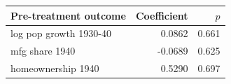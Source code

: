 \begin{tabular}{lrr}
\toprule
Pre-treatment outcome & Coefficient & $p$ \\
\midrule
log pop growth 1930-40 & 0.0862 & 0.661 \\
mfg share 1940 & -0.0689 & 0.625 \\
homeownership 1940 & 0.5290 & 0.697 \\
\bottomrule
\end{tabular}